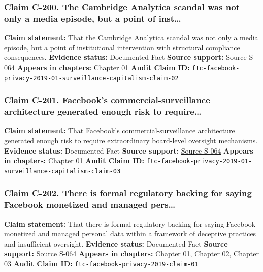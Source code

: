 \documentclass[
  american,
  11pt,
  letterpaper,
]{article}
\begin{document}
\subsubsection{Claim C-200. The Cambridge Analytica scandal was not only
a media episode, but a point of
inst\ldots{}}\label{claim-c-200-the-cambridge-analytica-scandal-was-not-only-a-media-episode-but-a-point-of-inst}

\textbf{Claim statement:} That the Cambridge Analytica scandal was not
only a media episode, but a point of institutional intervention with
structural compliance consequences. \textbf{Evidence status:} Documented
Fact \textbf{Source support:}
\hyperref[source-s-064-ftc-imposes-5-billion-penalty-and-sweeping-new-privacy-restrictions-on-facebook]{Source
S-064} \textbf{Appears in chapters:} Chapter 01 \textbf{Audit Claim ID:}
\texttt{ftc-facebook-privacy-2019-01-surveillance-capitalism-claim-02}

\subsubsection{Claim C-201. Facebook's commercial-surveillance
architecture generated enough risk to
require\ldots{}}\label{claim-c-201-facebooks-commercial-surveillance-architecture-generated-enough-risk-to-require}

\textbf{Claim statement:} That Facebook's commercial-surveillance
architecture generated enough risk to require extraordinary board-level
oversight mechanisms. \textbf{Evidence status:} Documented Fact
\textbf{Source support:}
\hyperref[source-s-064-ftc-imposes-5-billion-penalty-and-sweeping-new-privacy-restrictions-on-facebook]{Source
S-064} \textbf{Appears in chapters:} Chapter 01 \textbf{Audit Claim ID:}
\texttt{ftc-facebook-privacy-2019-01-surveillance-capitalism-claim-03}

\subsubsection{Claim C-202. There is formal regulatory backing for
saying Facebook monetized and managed
pers\ldots{}}\label{claim-c-202-there-is-formal-regulatory-backing-for-saying-facebook-monetized-and-managed-pers}

\textbf{Claim statement:} That there is formal regulatory backing for
saying Facebook monetized and managed personal data within a framework
of deceptive practices and insufficient oversight. \textbf{Evidence
status:} Documented Fact \textbf{Source support:}
\hyperref[source-s-064-ftc-imposes-5-billion-penalty-and-sweeping-new-privacy-restrictions-on-facebook]{Source
S-064} \textbf{Appears in chapters:} Chapter 01, Chapter 02, Chapter 03
\textbf{Audit Claim ID:} \texttt{ftc-facebook-privacy-2019-claim-01}
\end{document}
